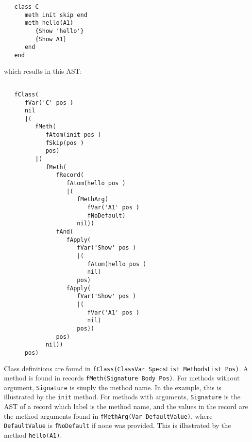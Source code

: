 \documentclass[a4paper]{memoir}
\begin{document}
\begin{lstlisting}
   class C
      meth init skip end
      meth hello(A1)
         {Show 'hello'}
         {Show A1}
      end
   end
\end{lstlisting}
which results in this AST:
\begin{lstlisting}

   fClass(
      fVar('C' pos )
      nil
      |(
         fMeth(
            fAtom(init pos )
            fSkip(pos )
            pos)
         |(
            fMeth(
               fRecord(
                  fAtom(hello pos )
                  |(
                     fMethArg(
                        fVar('A1' pos )
                        fNoDefault)
                     nil))
               fAnd(
                  fApply(
                     fVar('Show' pos )
                     |(
                        fAtom(hello pos )
                        nil)
                     pos)
                  fApply(
                     fVar('Show' pos )
                     |(
                        fVar('A1' pos )
                        nil)
                     pos))
               pos)
            nil))
      pos)
\end{lstlisting}

Class definitions are found in 
\lstinline!fClass(ClassVar SpecsList MethodsList Pos)!.
A method is found in records \lstinline!fMeth(Signature Body Pos)!.
For methods without argument, \lstinline!Signature! is simply the method name.
In the example, this is illustrated by the \lstinline!init! method.
For methods with arguments, \lstinline!Signature! is the AST of a record which label is the method name, and the
values in the record are the method arguments found in 
\lstinline!fMethArg(Var DefaultValue)!, where \lstinline!DefaultValue! is
\lstinline!fNoDefault! if none was provided.
This is illustrated by the method \lstinline!hello(A1)!.
\end{document}
